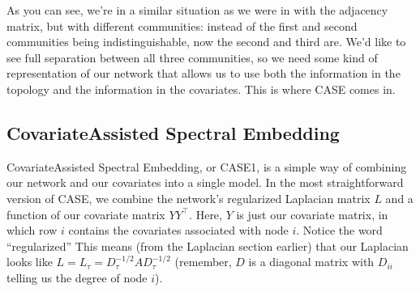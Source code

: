 \documentclass[letterpaper,10pt,english]{jupyterBook}
\begin{document}
\begin{sphinxVerbatim}[commandchars=\\\{\}]
   

   
         
     

   
\end{sphinxVerbatim}

\sphinxAtStartPar
As you can see, we’re in a similar situation as we were in with the adjacency matrix, but with different communities: instead of the first and second communities being indistinguishable, now the second and third are. We’d like to see full separation between all three communities, so we need some kind of representation of our network that allows us to use both the information in the topology and the information in the covariates. This is where CASE comes in.


\subsection{Covariate\sphinxhyphen{}Assisted Spectral Embedding}
\label{\detokenize{representations/ch6/joint-representation-learning:covariate-assisted-spectral-embedding}}
\sphinxAtStartPar
Covariate\sphinxhyphen{}Assisted Spectral Embedding, or CASE1, is a simple way of combining our network and our covariates into a single model. In the most straightforward version of CASE, we combine the network’s regularized Laplacian matrix \(L\) and a function of our covariate matrix \(YY^\top\). Here, \(Y\) is just our covariate matrix, in which row \(i\) contains the covariates associated with node \(i\). Notice the word “regularized” \sphinxhyphen{} This means (from the Laplacian section earlier) that our Laplacian looks like \(L = L_{\tau} = D_{\tau}^{-1/2} A D_{\tau}^{-1/2}\) (remember, \(D\) is a diagonal matrix with \(D_{ii}\) telling us the degree of node \(i\)).
\end{document}
